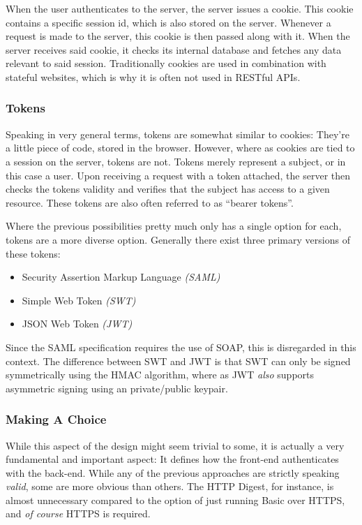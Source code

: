 				When the user authenticates to the server, the server issues a cookie. This cookie contains a specific session id, which is also stored on the server. Whenever a request is made to the server, this cookie is then passed along with it. When the server receives said cookie, it checks its internal database and fetches any data relevant to said session. Traditionally cookies are used in combination with stateful websites, which is why it is often not used in RESTful APIs.

			\subsubsection{Tokens}
				Speaking in very general terms, tokens are somewhat similar to cookies: They're a little piece of code, stored in the browser. However, where as cookies are tied to a session on the server, tokens are not. Tokens merely represent a subject, or in this case a user. Upon receiving a request with a token attached, the server then checks the tokens validity and verifies that the subject has access to a given resource. These tokens are also often referred to as ``bearer tokens''.

				Where the previous possibilities pretty much only has a single option for each, tokens are a more diverse option. Generally there exist three primary versions of these tokens:
				\begin{itemize}
					\item Security Assertion Markup Language \emph{(SAML)}
					\item Simple Web Token \emph{(SWT)}
					\item JSON Web Token \emph{(JWT)}
				\end{itemize}
				Since the SAML specification requires the use of SOAP, this is disregarded in this context. The difference between SWT and JWT is that SWT can only be signed symmetrically using the HMAC algorithm, where as JWT \emph{also} supports asymmetric signing using an private/public keypair\cite{auth0_jwt}.

			\subsubsection{Making A Choice}
				While this aspect of the design might seem trivial to some, it is actually a very fundamental and important aspect: It defines how the front-end authenticates with the back-end. While any of the previous approaches are strictly speaking \emph{valid}, some are more obvious than others. The HTTP Digest, for instance, is almost unnecessary compared to the option of just running Basic over HTTPS, and \emph{of course} HTTPS is required.

